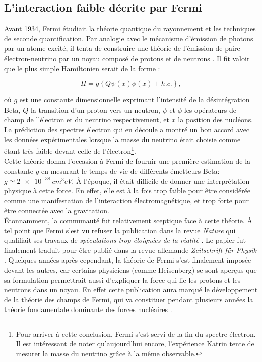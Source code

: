 \subsection{L'interaction faible décrite par Fermi}

Avant 1934, Fermi étudiait la théorie quantique du rayonnement et les techniques de seconde quantification. Par analogie avec le mécanisme d'émission de photons par un atome excité, il tenta de construire une théorie de l'émission de paire électron-neutrino par un noyau composé de protons et de neutrons \cite{Fermi1934}. Il fit valoir que le plus simple Hamiltonien serait de la forme :

\label{eq:simplest_hamiltonian}
\begin{equation}
    H = g \left\{ Q\psi(x)\phi(x) + h.c. \right\} ,
\end{equation}

\bigbreak

où $g$ est une constante dimensionnelle exprimant l'intensité de la désintégration Beta, $Q$ la transition d'un proton vers un neutron, $\psi$ et $\phi$ les opérateurs de champ de l'électron et du neutrino respectivement, et $x$ la position des nucléons. La prédiction des spectres électron qui en découle a montré un bon accord avec les données expérimentales lorsque la masse du neutrino était choisie comme étant très faible devant celle de l'électron\footnote{Pour arriver à cette conclusion, Fermi s'est servi de la fin du spectre électron. Il est intéressant de noter qu'aujourd'hui encore, l'expérience Katrin tente de mesurer la masse du neutrino grâce à la même observable.}.\\

Cette théorie donna l'occasion à Fermi de fournir une première estimation de la constante $g$ en mesurant le temps de vie de différents émetteurs Beta: $g \simeq \SI{2e-38}{cm^3eV}$. \`A l'époque, il était difficile de donner une interprétation physique à cette force. En effet, elle est à la fois trop faible pour être considérée comme une manifestation de l'interaction électromagnétique, et trop forte pour être connectée avec la gravitation.\\


Étonnamment, la communauté fut relativement sceptique face à cette théorie. À tel point que Fermi s'est vu refuser la publication dans la revue \textit{Nature} qui qualifiait ses travaux de \og \textit{spéculations trop éloignées de la réalité} \fg{} \cite{rutherford_1939}. Le papier fut finalement traduit pour être publié dans la revue allemande \textit{Zeitschrift für Physik} \cite{Fermi1934}. Quelques années après cependant, la théorie de Fermi s'est finalement imposée devant les autres, car certains physiciens (comme Heisenberg) se sont aperçus que sa formulation permettrait aussi d'expliquer la force qui lie les protons et les neutrons dans un noyau. En effet cette publication aura marqué le développement de la théorie des champs de Fermi, qui va constituer pendant plusieurs années la théorie fondamentale dominante des forces nucléaires \cite{doi:10.1119/1.15352}.

